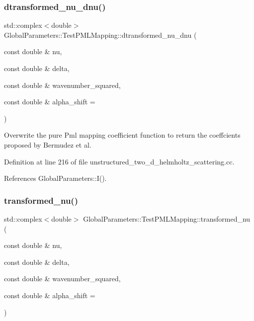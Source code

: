 \subsubsection{\texorpdfstring{dtransformed\+\_\+nu\+\_\+dnu()}{dtransformed\_nu\_dnu()}}
{\footnotesize\ttfamily std\+::complex$<$double$>$ Global\+Parameters\+::\+Test\+P\+M\+L\+Mapping\+::dtransformed\+\_\+nu\+\_\+dnu (\begin{DoxyParamCaption}\item[{const double \&}]{nu,  }\item[{const double \&}]{delta,  }\item[{const double \&}]{wavenumber\+\_\+squared,  }\item[{const double \&}]{alpha\+\_\+shift = {} }\end{DoxyParamCaption})\hspace{0.3cm}{\ttfamily [inline]}}



Overwrite the pure Pml mapping coefficient function to return the coeffcients proposed by Bermudez et al. 



Definition at line 216 of file unstructured\+\_\+two\+\_\+d\+\_\+helmholtz\+\_\+scattering.\+cc.



References Global\+Parameters\+::\+I().

\mbox{\label{classGlobalParameters_1_1TestPMLMapping_a73188c5c41f61263bebd647f68375732}} 
\subsubsection{\texorpdfstring{transformed\+\_\+nu()}{transformed\_nu()}}
{\footnotesize\ttfamily std\+::complex$<$double$>$ Global\+Parameters\+::\+Test\+P\+M\+L\+Mapping\+::transformed\+\_\+nu (\begin{DoxyParamCaption}\item[{const double \&}]{nu,  }\item[{const double \&}]{delta,  }\item[{const double \&}]{wavenumber\+\_\+squared,  }\item[{const double \&}]{alpha\+\_\+shift = {} }\end{DoxyParamCaption})\hspace{0.3cm}{\ttfamily [inline]}}




